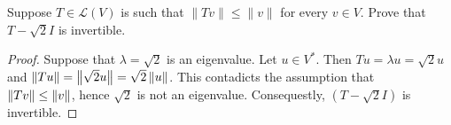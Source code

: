 Suppose $T \in \mathcal{L}(V)$ is such that $\|Tv\| \le \|v\|$ for every $v \in V$.  Prove that $T - \sqrt{2} I$ is invertible.
\begin{mybox}
    \begin{proof}
        Suppose that $\lambda = \sqrt2$ is an eigenvalue. Let $u \in V^*$. Then $Tu = \lambda u = \sqrt 2 u$ and $\left\| {Tu} \right\| = \left\| {\sqrt{2} u} \right\| = \sqrt{2} \left\| {u} \right\|$. This contadicts the assumption that \\$\left\| {Tv} \right\| \le \left\| {v} \right\|$, hence $\sqrt2$ is not an eigenvalue. Consequestly, $(T-\sqrt{2}I)$ is invertible.
    \end{proof}
\end{mybox}